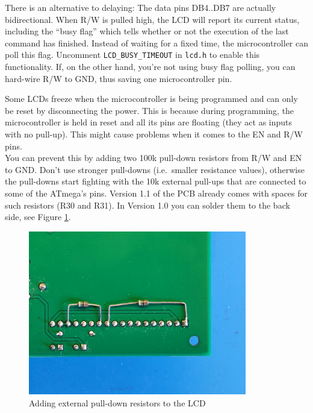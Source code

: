 \documentclass{article}
\newenvironment{note}{\begin{tcolorbox}[colback=blue!5!white,colframe=blue!75!black,title=\textbf{Note}]}{\end{tcolorbox}}
\newcommand{\file}[1]{\texttt{#1}}
\begin{document}
There is an alternative to delaying: The data pins DB4..DB7 are actually bidirectional. When R/W is pulled high, the LCD will report its current status, including the ``busy flag'' which tells whether or not the execution of the last command has finished. Instead of waiting for a fixed time, the microcontroller can poll this flag. Uncomment \lstinline[language=C]{LCD_BUSY_TIMEOUT} in \file{lcd.h} to enable this functionality. 
If, on the other hand, you're not using busy flag polling, you can hard-wire R/W to GND, thus saving one microcontroller pin. 

\begin{note}
Some LCDs freeze when the microcontroller is being programmed and can only be reset by disconnecting the power. This is because during programming, the microcontroller is held in reset and all its pins are floating (they act as inputs with no pull-up). This might cause problems when it comes to the EN and R/W pins. \\
You can prevent this by adding two 100k\textOmega{} pull-down resistors from R/W and EN to GND. Don't use stronger pull-downs (i.e.\ smaller resistance values), otherwise the pull-downs start fighting with the 10k\textOmega{} external pull-ups that are connected to some of the ATmega's pins. Version 1.1 of the PCB already comes with spaces for such resistors (R30 and R31). In Version 1.0 you can solder them to the back side, see Figure \ref{fig:lcdPullDowns}. 
\end{note}

\begin{figure}[htb]
\centering
\includegraphics[width=0.85\textwidth]{Pictures/LCDPullDowns.jpg}
\caption{Adding external pull-down resistors to the LCD}
\label{fig:lcdPullDowns}
\end{figure}
\end{document}
